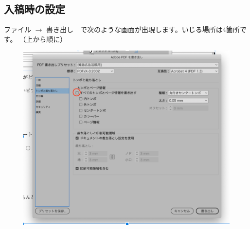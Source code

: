 \documentclass[dvipdfmx,jb5]{jarticle}
\begin{document}
\subsection{入稿時の設定}
ファイル $\rightarrow$ 書き出し　で次のような画面が出現します。いじる場所は4箇所です。
（上から順に）
\begin{figure}[H]
  \includegraphics[scale=0.7]{assets/pmh1.png}
\end{figure}
\end{document}
